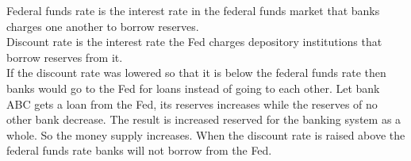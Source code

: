 \documentclass[12pt]{article}
\begin{document}
\begin{soln}
	Federal funds rate is the interest rate in the federal funds market that banks charges one another to borrow reserves.\\

	Discount rate is the interest rate the Fed charges depository institutions that borrow reserves from it.\\

	If the discount rate was lowered so that it is below the federal funds rate then banks would go to the Fed for loans instead of going to each other. Let bank ABC gets a loan from the Fed, its reserves increases while the reserves of no other bank decrease. The result is increased reserved for the banking system as a whole. So the money supply increases. When the discount rate is raised above the federal funds rate banks will not borrow from the Fed.
\end{soln}
\end{document}
